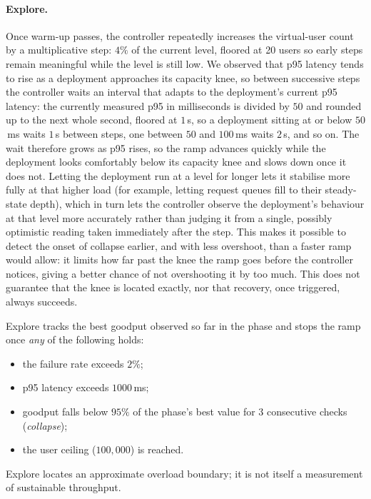 \paragraph{Explore.}
Once warm-up passes, the controller repeatedly increases the virtual-user
count by a multiplicative step: $4\%$ of the current level, floored at
20 users so early steps remain meaningful while the level is still low.
We observed that p95 latency tends to rise
as a deployment approaches its capacity knee, so between successive steps
the controller waits an interval that adapts to the deployment's current
p95 latency: the currently measured p95 in milliseconds is divided by
$50$ and rounded up to the next whole second, floored at $1$\,s, so a
deployment sitting at or below $50$\,ms waits $1$\,s between steps, one
between $50$ and $100$\,ms waits $2$\,s, and so on. The wait therefore
grows as p95 rises, so the ramp advances quickly while the deployment
looks comfortably below its capacity knee and slows down once it does
not. Letting the deployment run at a level for longer
lets it stabilise more fully at that higher load (for example, letting
request queues fill to their steady-state depth), which in turn lets the
controller observe the deployment's behaviour at that level more
accurately rather than judging it from a single, possibly optimistic
reading taken immediately after the step. This makes it possible to
detect the onset of collapse earlier, and with less overshoot, than a
faster ramp would allow: it limits how far past the knee the ramp goes
before the controller notices, giving a better chance of not
overshooting it by too much. This does not guarantee that the knee is
located exactly, nor that recovery, once triggered, always succeeds.

Explore tracks the best goodput observed so far in the phase and stops
the ramp once \emph{any} of the following holds:
\begin{itemize}
  \item the failure rate exceeds $2\%$;
  \item p95 latency exceeds $1000$\,ms;
  \item goodput falls below $95\%$ of the phase's best value for 3
        consecutive checks (\emph{collapse});
  \item the user ceiling ($100{,}000$) is reached.
\end{itemize}
Explore locates an approximate overload boundary; it is not itself a
measurement of sustainable throughput.

